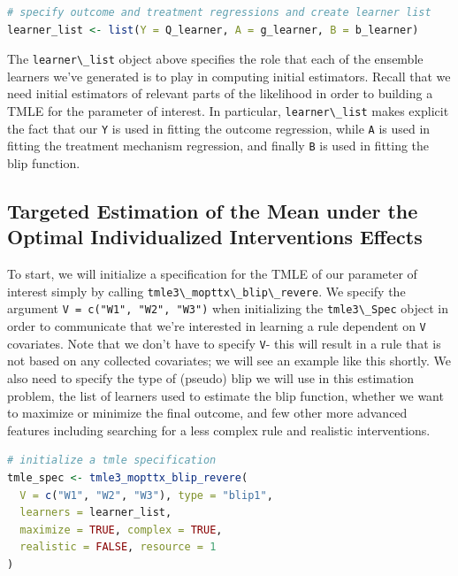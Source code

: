 \documentclass[
  12pt, krantz2,
]{krantz}
\newcommand{\passthrough}[1]{#1}
\theoremstyle{definition}
\theoremstyle{definition}
\theoremstyle{definition}
\newcommand{\1}{\mathbbm{1}}
\begin{document}
\begin{lstlisting}[language=R]
# specify outcome and treatment regressions and create learner list
learner_list <- list(Y = Q_learner, A = g_learner, B = b_learner)
\end{lstlisting}

The \passthrough{\lstinline!learner\_list!} object above specifies the role that each of the ensemble
learners we've generated is to play in computing initial estimators. Recall that
we need initial estimators of relevant parts of the likelihood in order to
building a TMLE for the parameter of interest. In particular, \passthrough{\lstinline!learner\_list!}
makes explicit the fact that our \passthrough{\lstinline!Y!} is used in fitting the outcome regression,
while \passthrough{\lstinline!A!} is used in fitting the treatment mechanism regression, and finally \passthrough{\lstinline!B!}
is used in fitting the blip function.

\hypertarget{targeted-estimation-of-the-mean-under-the-optimal-individualized-interventions-effects}{%
\subsection{Targeted Estimation of the Mean under the Optimal Individualized Interventions Effects}\label{targeted-estimation-of-the-mean-under-the-optimal-individualized-interventions-effects}}

To start, we will initialize a specification for the TMLE of our parameter of
interest simply by calling \passthrough{\lstinline!tmle3\_mopttx\_blip\_revere!}. We specify the argument
\passthrough{\lstinline!V = c("W1", "W2", "W3")!} when initializing the \passthrough{\lstinline!tmle3\_Spec!} object in order to
communicate that we're interested in learning a rule dependent on \passthrough{\lstinline!V!}
covariates. Note that we don't have to specify \passthrough{\lstinline!V!}- this will result in a rule
that is not based on any collected covariates; we will see an example like this
shortly. We also need to specify the type
of (pseudo) blip we will use in this estimation problem, the list of learners used
to estimate the blip function, whether we want to maximize or minimize the final
outcome, and few other more advanced features including searching for a less
complex rule and realistic interventions.

\begin{lstlisting}[language=R]
# initialize a tmle specification
tmle_spec <- tmle3_mopttx_blip_revere(
  V = c("W1", "W2", "W3"), type = "blip1",
  learners = learner_list,
  maximize = TRUE, complex = TRUE,
  realistic = FALSE, resource = 1
)
\end{lstlisting}
\end{document}
